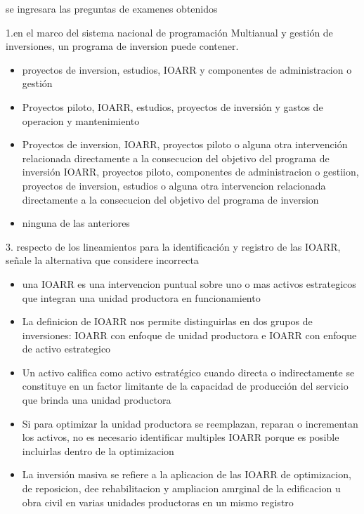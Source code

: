 se ingresara las preguntas de examenes obtenidos




1.en el marco del sistema nacional de programación Multianual y gestión de inversiones, un programa de inversion puede contener.
\begin{itemize}
			\item proyectos de inversion, estudios, IOARR y componentes de administracion o gestión 
			\item Proyectos piloto, IOARR, estudios, proyectos de inversión y gastos de operacion y mantenimiento
			\item Proyectos de inversion, IOARR, proyectos piloto o alguna otra intervención relacionada directamente a la consecucion del objetivo del programa de inversión 
			\iterm IOARR, proyectos piloto, componentes de administracion o gestiion, proyectos de inversion, estudios o alguna otra intervencion relacionada directamente a la consecucion del objetivo del programa de inversion
			\item ninguna de las anteriores 

\end{itemize}


3. respecto de los lineamientos para la identificación y registro de las IOARR, señale la alternativa que considere incorrecta

\begin{itemize}

			\item una IOARR es una intervencion puntual sobre uno o mas activos estrategicos que integran una unidad productora en funcionamiento
			\item La definicion de IOARR nos permite distinguirlas en dos grupos de inversiones: IOARR con enfoque de unidad productora e IOARR con enfoque de activo estrategico 
			\item Un activo califica como activo estratégico cuando directa o indirectamente se constituye en un factor limitante de la capacidad de producción del servicio que brinda una unidad productora
			\item Si para optimizar la unidad productora se reemplazan, reparan o incrementan los activos, no es necesario identificar multiples IOARR porque es posible incluirlas dentro de la optimizacion
			\item La inversión masiva se refiere a la aplicacion de las IOARR de optimizacion, de reposicion, dee rehabilitacion y ampliacion amrginal de la edificacion u obra civil en varias unidades productoras en un mismo registro 
		

\end{itemize}

